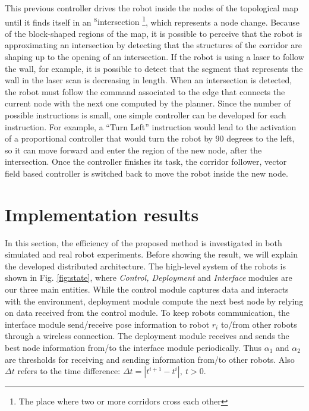 \documentclass[smallcondensed]{svjour3}
\begin{document}
This previous controller drives the robot inside the nodes of the topological map until it finds itself in an {\color{blue}$^8$intersection \footnote{The place where two or more corridors cross each other}}, which represents a node change. Because of the block-shaped regions of the map, it is possible to perceive that the robot is approximating an intersection by detecting that the structures of the corridor are shaping up to the opening of an intersection. If the robot is using a laser to follow the wall, for example, it is possible to detect that the segment that represents the wall in the laser scan is decreasing in length. When an intersection is detected, the robot must follow the command associated to the edge that connects the current node with the next one computed by the planner. Since the number of possible instructions is small, one simple controller can be developed for each instruction.  For example, a ``Turn Left'' instruction would lead to the activation of a proportional controller that would turn the robot by 90 degrees to the left, so it can move forward and enter the region of the new node, after the intersection. Once the controller finishes its task, the corridor follower, vector field based controller is switched back to move the robot inside the new node. 

\section{Implementation results}
\label{sec:implementation}


In this section, the efficiency of the proposed method is investigated in both simulated and real robot experiments. Before showing the result, we will explain the developed distributed architecture. The high-level system of the robots is shown in Fig. \ref{fig:state}, where \textit{Control, Deployment} and \textit{Interface} modules are our three main entities. While the control module captures data and interacts with the environment, deployment module compute the next best node by relying on data received from the control module. To keep robots communication, the interface module send/receive pose information to robot $r_i$ to/from other robots through a wireless connection. The deployment module receives and sends the best node information from/to the interface module periodically. Thus $\alpha_1$ and $\alpha_2$ are thresholds for receiving and sending information from/to other robots. Also  $\Delta t $ refers to the time difference: $\Delta t=|t^{i+1}-t^i|,~ t>0$.
\end{document}
